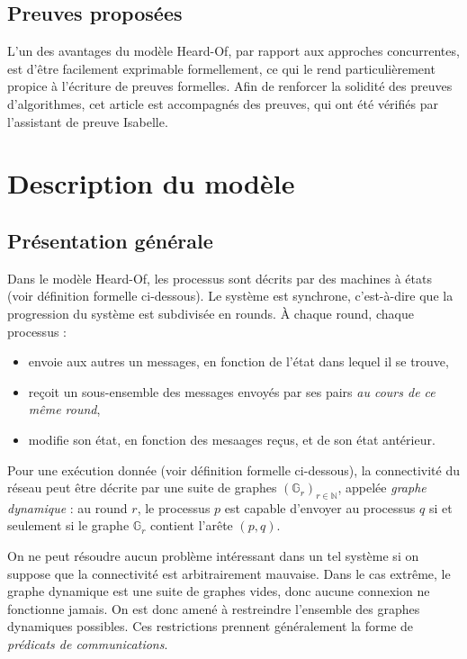 \documentclass{article}
\begin{document}
\subsection{Preuves proposées}

L'un des avantages du modèle Heard-Of, par rapport aux approches concurrentes, est d'être facilement exprimable formellement, ce qui le rend particulièrement propice à l'écriture de preuves formelles.
Afin de renforcer la solidité des preuves d'algorithmes, cet article est accompagnés des preuves, qui ont été vérifiés par l'assistant de preuve Isabelle.

\section{Description du modèle}

\subsection{Présentation générale}

Dans le modèle Heard-Of, les processus sont décrits par des machines à états (voir définition formelle ci-dessous).
Le système est synchrone, c'est-à-dire que la progression du système est subdivisée en rounds. À chaque round, chaque processus :
\begin{itemize}
	\item envoie aux autres un messages, en fonction de l'état dans lequel il se trouve,
	\item reçoit un sous-ensemble des messages envoyés par ses pairs \emph{au cours de ce même round},
	\item modifie son état, en fonction des mesaages reçus, et de son état antérieur.
\end{itemize}

Pour une exécution donnée (voir définition formelle ci-dessous), la connectivité du réseau peut être décrite par une suite de graphes $(\mathds{G}_r)_{r \in \mathds{N}}$, appelée \textit{graphe dynamique} :
au round $r$, le processus $p$ est capable d'envoyer au processus $q$ si et seulement si le graphe $\mathds{G}_r$ contient l'arête $(p,q)$.

On ne peut résoudre aucun problème intéressant dans un tel système si on suppose que la connectivité est arbitrairement mauvaise. Dans le cas extrême, le graphe dynamique est une suite de graphes vides, 
donc aucune connexion ne fonctionne jamais.
On est donc amené à restreindre l'ensemble des graphes dynamiques possibles. Ces restrictions prennent généralement la forme de \emph{prédicats de communications}.
\end{document}
